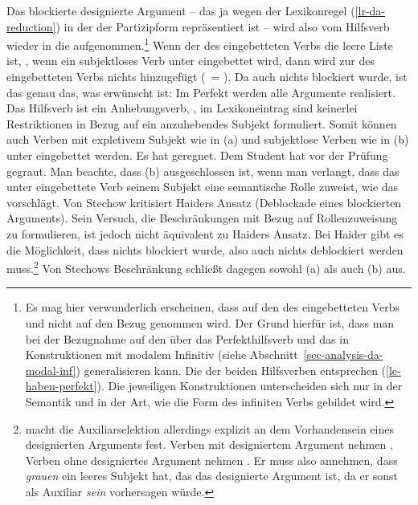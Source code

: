\noindent
Das blockierte designierte Argument -- das ja wegen der Lexikonregel (\ref{lr-da-reduction}) in der \subjl der Partizipform
repräsentiert ist -- wird also vom Hilfsverb wieder in die \compsl aufgenommen.\footnote{
  Es mag hier verwunderlich erscheinen, dass auf den \subjw des eingebetteten Verbs und nicht
  auf den \daw Bezug genommen wird. Der Grund hierfür ist, dass man bei der Bezugnahme
  auf den \subjw über das Perfekthilfsverb \haben und das \haben in Konstruktionen mit modalem
  Infinitiv (siehe Abschnitt~\ref{sec-analysis-da-modal-inf}) generalisieren kann. Die \catwe der beiden Hilfsverben entsprechen
  (\ref{le-haben-perfekt}). Die jeweiligen Konstruktionen unterscheiden sich nur in der Semantik und in der Art, wie
  die Form des infiniten Verbs gebildet wird.%
}
Wenn der \subjw des eingebetteten Verbs die leere Liste ist, \dash, wenn ein subjektloses Verb unter \haben 
eingebettet wird, dann wird zur \compsl des eingebetteten Verbs nichts hinzugefügt (\, = \eliste).
Da auch nichts blockiert wurde, ist das genau das, was erwünscht ist:
Im Perfekt werden alle Argumente realisiert. Das Hilfsverb ist
ein Anhebungsverb, \dash, im Lexikoneintrag sind keinerlei Restriktionen in Bezug auf ein anzuhebendes
Subjekt formuliert. Somit können auch Verben mit expletivem Subjekt wie in (a)
und subjektlose Verben wie in (b) unter \haben eingebettet
werden.
\eal
\ex{}
Es hat geregnet.
\ex{}\label{ex-hat-gegraut}
Dem Student hat vor der Prüfung gegraut.
\zl
Man beachte, dass (b) ausgeschlossen ist, wenn man verlangt, dass das
unter \haben eingebettete Verb seinem Subjekt eine semantische Rolle zuweist,
wie das \zb \citet[]{Stechow90a} vorschlägt. Von Stechow kritisiert Haiders Ansatz
(Deblockade eines blockierten Arguments). Sein Versuch, die Beschränkungen mit Bezug
auf Rollenzuweisung zu formulieren, ist jedoch nicht äquivalent zu Haiders Ansatz. Bei Haider
gibt es die Möglichkeit, dass nichts blockiert wurde, also auch nichts deblockiert werden muss.\footnote{
        \textcites[]{Haider84a}[]{Haider86} macht die Auxiliarselektion allerdings explizit
        an dem Vorhandensein eines designierten Arguments fest. Verben mit designiertem
        Argument nehmen \haben, Verben ohne designiertes Argument nehmen \sein. Er muss
        also annehmen, dass \emph{grauen} ein leeres Subjekt hat, das das designierte
        Argument ist, da er sonst als Auxiliar \emph{sein} vorhersagen würde.%
}
Von Stechows Beschränkung schließt dagegen sowohl (a) als auch (b) aus.
